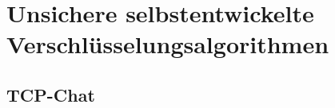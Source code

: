 \documentclass[a4paper,12bpt]{scrartcl}
\begin{document}
\section{Unsichere selbstentwickelte Verschlüsselungsalgorithmen}
\label{sec:crypto}

\begin{appendices}
  \section{TCP-Chat}
  \label{sec:TCP-Chat}
  
  
  
\end{appendices}
\end{document}
